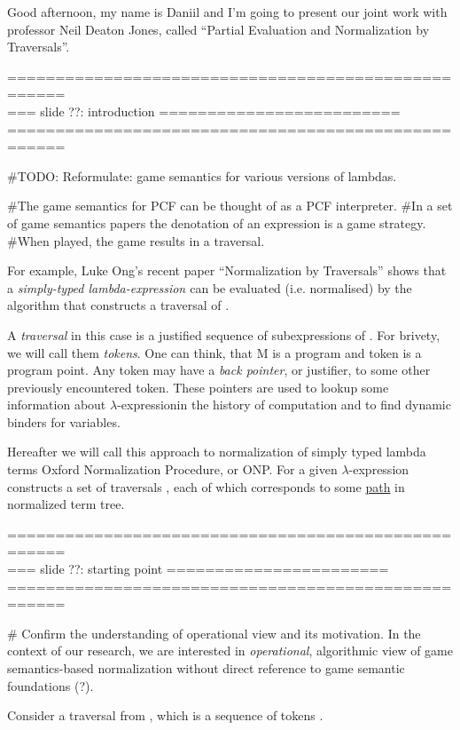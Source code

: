 \documentclass[a4paper, 10pt]{article} %
\newcommand{\red}[1]{{\color{red}#1}}
\newcommand{\green}[1]{{\color{blue!20!black!30!green}#1}}
\newcommand{\blue}[1]{{\color{blue}#1}}
\newcommand{\lam}[1]{{\color{brown}\textit{\boldmath{#1}}}}
\newcommand{\lexp}{$\lambda$-expression}
\begin{document}
Good afternoon, my name is Daniil and I'm going to present our joint work with 
professor Neil Deaton Jones, called ``Partial Evaluation and Normalization by 
Traversals''. 


====================================================\\
=== slide ??: introduction =========================\\
====================================================


#TODO:
Reformulate: game semantics for various versions of lambdas.

#The game semantics for PCF can be thought of as a PCF interpreter.
#In a set of game semantics papers the denotation of an expression is a game strategy. 
#When played, the game results in a traversal.

For example, Luke Ong’s recent paper ``Normalization by Traversals'' shows that a \blue{\textit{simply-typed 
lambda-expression \lam{M}}} can be \red{evaluated} (i.e. normalised) by the algorithm that 
constructs a \green{traversal} of \lam{M}.

A \green{\textit{traversal}} in this case is a justified sequence of subexpressions of \lam{M}.
For brivety, we will call them \green{\textit{tokens}}.  One can think, that M is 
a \blue{program} and token is a \blue{program point}. Any token may have a \green{\textit{back pointer}}, 
or justifier, to some other previously encountered token. These pointers are used to lookup some 
information about \lexp in the history of computation and to find dynamic binders for variables.

Hereafter we will call this approach to normalization of simply typed lambda terms Oxford Normalization Procedure, 
or ONP. For a given \lexp \lam{$M$} \lam{ONP} constructs a set of traversals \lam{$\mathfrak{Trav}(M)$}, each 
of which corresponds to some \underline{path} in normalized term tree.


====================================================\\
=== slide ??: starting point =======================\\
====================================================

# Confirm the understanding of operational view and its motivation.
In the context of our research, we are interested in \emph{operational}, algorithmic 
view of game semantics-based normalization without direct reference to game semantic
foundations (?).

Consider a traversal \lam{$tr$} from \lam{$\mathfrak{Trav}(M)$}, which is a sequence of tokens \lam{$t_0$} \lam{$t_n$}.
\end{document}
